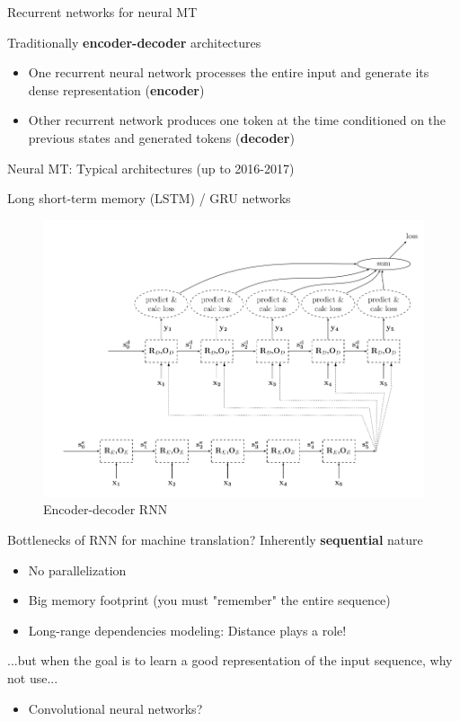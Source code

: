 \documentclass[12pt,aspectratio=169,handout]{beamer}
\begin{document}
\begin{frame}{Recurrent networks for neural MT}
	
	Traditionally \textbf{encoder-decoder} architectures	
	
	\begin{itemize}
		\item One recurrent neural network processes the entire input and generate its dense representation (\textbf{encoder})
		\item Other recurrent network produces one token at the time conditioned on the previous states and generated tokens (\textbf{decoder})
	\end{itemize}
\end{frame}


\begin{frame}{Neural MT: Typical architectures (up to 2016-2017)}
	
	Long short-term memory (LSTM) / GRU networks
	
	
	\begin{figure}
		\includegraphics[width=0.65\linewidth]{img/end-dec.png}
		\caption{Encoder-decoder RNN}
	\end{figure}
	

\end{frame}


\begin{frame}{Bottlenecks of RNN for machine translation?}
	Inherently \textbf{sequential} nature
	
	\begin{itemize}
		\item No parallelization
		\item Big memory footprint (you must "remember" the entire sequence)
		\item Long-range dependencies modeling: Distance plays a role!
	\end{itemize}
	
	...but when the goal is to learn a good representation of the input sequence, why not use...
	
	\begin{itemize}
		\item Convolutional neural networks?
	\end{itemize}
	
\end{frame}
\end{document}
